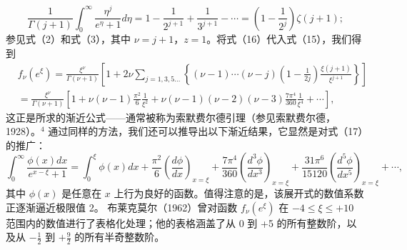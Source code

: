 \begin{equation}\tag{17.5.14}\label{eq:17.5.14}
\frac { 1 } { \Gamma ( j + 1 ) } \int _ { 0 } ^{\infty} \frac { \eta ^{j} } { e ^{\eta} + 1 } d \eta = 1 - \frac { 1 } { 2 ^{j + 1} } + \frac { 1 } { 3 ^{j + 1} } - \cdots = \left( 1 - \frac { 1 } { 2 ^{j} } \right) \zeta ( j + 1 ) ;
\end{equation}
参见式（2）和式（3），其中 \(\nu=j+1\)，\(z=1\)。将式（16）代入式（15），我们得到
\begin{equation}\tag{17.5.15}\label{eq:17.5.15}
\begin{array}{rl} & { f _ { \nu } ( e ^{\xi} ) = \frac { \xi ^{\nu} } { \Gamma ( \nu + 1 ) } \left[ 1 + 2 \nu \sum _ { j = 1 , 3 , 5 \dots } \left\{ ( \nu - 1 ) \cdots ( \nu - j ) \left( 1 - \frac { 1 } { 2 j } \right) \frac { \xi ( j + 1 ) } { \xi ^{j + 1} } \right\} \right] } \\& { = \frac { \xi ^{\nu} } { \Gamma ( \nu + 1 ) } \left[ 1 + \nu ( \nu - 1 ) \frac { \pi ^{2} } { 6 } \frac { 1 } { \xi ^{2} } + \nu ( \nu - 1 ) ( \nu - 2 ) ( \nu - 3 ) \frac { 7 \pi ^{4} } { 36 0 } \frac { 1 } { \xi ^{4} } + \cdots \right] , } \end{array}
\end{equation}
这正是所求的渐近公式——通常被称为索默费尔德引理（参见索默费尔德，1928）。\(^{4}\)
通过同样的方法，我们还可以推导出以下渐近结果，它显然是对式（17）的推广：
\begin{equation}\tag{17.5.16}\label{eq:17.5.16}
\int _ { 0 } ^{\infty} \frac { \phi ( x ) d x } { e ^{x - \xi} + 1 } = \int _ { 0 } ^{\xi} \phi ( x ) d x + \frac { \pi ^{2} } { 6 } \left( \frac { d \phi } { d x } \right) _ { x = \xi } + \frac { 7 \pi ^{4} } { 36 0 } \left( \frac { d ^{3} \phi } { d x ^{3} } \right) _ { x = \xi } + \frac { 31 \pi ^{6} } { 15 12 0 } \left( \frac { d ^{5} \phi } { d x ^{5} } \right) _ { x = \xi } + \cdots ,
\end{equation}
其中 \(\phi(x)\) 是任意在 \(x\) 上行为良好的函数。值得注意的是，该展开式的数值系数正逐渐逼近极限值 2。
布莱克莫尔（1962）曾对函数 \(f_{\nu}(e^{\xi})\) 在 \(-4 \leq \xi \leq +10\) 范围内的数值进行了表格化处理；他的表格涵盖了从 0 到 +5 的所有整数阶，以及从 \(-\frac{1}{2}\) 到 \(+\frac{9}{2}\) 的所有半奇整数阶。
